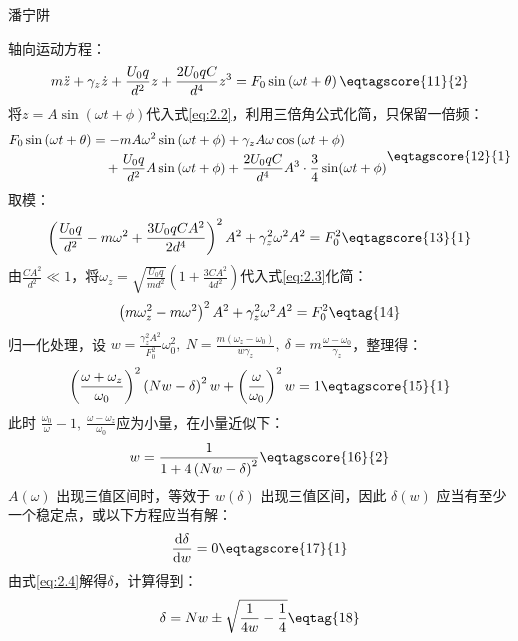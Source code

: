 \documentclass[answer]{cphos}
\begin{document}
\begin{problem}[40]{潘宁阱}
\begin{solution}
轴向运动方程：
\begin{equation}
	m\ddot{z}+\gamma_z \dot{z}+\frac{U_0 q}{d^2}z+\frac{2U_0 qC}{d^4}z^{3}=F_0\sin \left(\omega t+\theta\right) \eqtagscore{11}{2}\label{eq:2.2}
\end{equation}
将$z=A\sin \left(\omega t+\phi\right)$代入式\ref{eq:2.2}，利用三倍角公式化简，只保留一倍频：
\begin{equation}
	\begin{aligned}
		F_0\sin \left(\omega t+\theta\right)&=-mA\omega^2\sin \left(\omega t+\phi\right)+\gamma_z A\omega\cos \left(\omega t+\phi\right) \\
		&\quad +\frac{U_0 q}{d^2}A\sin \left(\omega t+\phi\right)+\frac{2U_0qC}{d^4}A^3\cdot\frac34\sin(\omega t+\phi)
	\end{aligned} \eqtagscore{12}{1}
\end{equation}
取模：
\begin{equation}
	\left(\frac{U_0 q}{d^2}-m\omega^2+\frac{3U_0 qCA^2}{2d^4}\right)^2 A^2+\gamma_z ^2 \omega^2 A^2=F_0^2\eqtagscore{13}{1}\label{eq:2.3}
\end{equation}
由$\frac{CA^2}{d^2} \ll 1$，将$\omega_z=\sqrt{\frac{U_0 q}{md^2}}\left(1+\frac{3CA^2}{4d^2}\right)$代入式\ref{eq:2.3}化简：
\begin{equation}
	\left(m\omega_z^2-m\omega^2\right)^2 A^2+\gamma_z ^2 \omega^2 A^2=F_0^2\eqtag{14}
\end{equation}
归一化处理，设 $w=\frac{\gamma_z^2A^2}{F_0^2}\omega_0^2,\ N=\frac{m(\omega_z-\omega_0)}{w\gamma_z},\ \delta=m\frac{\omega-\omega_0}{\gamma_z}$，整理得：
\begin{equation}
	\left(\frac{\omega+\omega_z}{\omega_0} \right)^2 \left(Nw-\delta\right)^2 w+ \left(\frac{\omega}{\omega_0} \right)^2 w=1 \eqtagscore{15}{1}
\end{equation}
此时 $\frac{\omega_0}{\omega}-1,\ \frac{\omega-\omega_z}{\omega_0}$应为小量，在小量近似下：
\begin{equation}
	w=\frac{1}{1+4\left(Nw-\delta\right)^2}\eqtagscore{16}{2} \label{eq:2.4}
\end{equation}
$A(\omega)$ 出现三值区间时，等效于 $w(\delta)$ 出现三值区间，因此 $\delta(w)$ 应当有至少一个稳定点，或以下方程应当有解：
\begin{equation}
	\frac{\mathrm{d}\delta}{\mathrm{d}w}=0\eqtagscore{17}{1}
\end{equation}
由式\ref{eq:2.4}解得$\delta$，计算得到：
\begin{equation}
	\delta=Nw \pm \sqrt{\frac{1}{4w}-\frac{1}{4}}\eqtag{18}\label{eq:2.5}

\end{equation}
\end{solution}
\end{problem}
\end{document}
